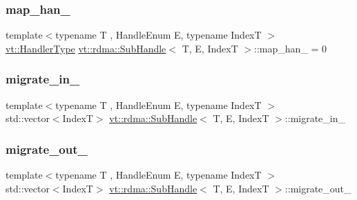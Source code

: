 \mbox{\label{structvt_1_1rdma_1_1_sub_handle_a5ecf30f3c569bbfe574df42843cf0059}} 
\subsubsection{\texorpdfstring{map\+\_\+han\+\_\+}{map\_han\_}}
{\footnotesize\ttfamily template$<$typename T , Handle\+Enum E, typename IndexT $>$ \\
\hyperlink{namespacevt_af64846b57dfcaf104da3ef6967917573}{vt\+::\+Handler\+Type} \hyperlink{structvt_1_1rdma_1_1_sub_handle}{vt\+::rdma\+::\+Sub\+Handle}$<$ T, E, IndexT $>$\+::map\+\_\+han\+\_\+ = 0\hspace{0.3cm}{\ttfamily [protected]}}

\mbox{\label{structvt_1_1rdma_1_1_sub_handle_a2832d6a83d0ecc36d342d33fcf5ce6dd}} 
\subsubsection{\texorpdfstring{migrate\+\_\+in\+\_\+}{migrate\_in\_}}
{\footnotesize\ttfamily template$<$typename T , Handle\+Enum E, typename IndexT $>$ \\
std\+::vector$<$IndexT$>$ \hyperlink{structvt_1_1rdma_1_1_sub_handle}{vt\+::rdma\+::\+Sub\+Handle}$<$ T, E, IndexT $>$\+::migrate\+\_\+in\+\_\+\hspace{0.3cm}{\ttfamily [protected]}}

\mbox{\label{structvt_1_1rdma_1_1_sub_handle_a13c434425c8ab69abfd202acf8979119}} 
\subsubsection{\texorpdfstring{migrate\+\_\+out\+\_\+}{migrate\_out\_}}
{\footnotesize\ttfamily template$<$typename T , Handle\+Enum E, typename IndexT $>$ \\
std\+::vector$<$IndexT$>$ \hyperlink{structvt_1_1rdma_1_1_sub_handle}{vt\+::rdma\+::\+Sub\+Handle}$<$ T, E, IndexT $>$\+::migrate\+\_\+out\+\_\+\hspace{0.3cm}{\ttfamily [protected]}}

